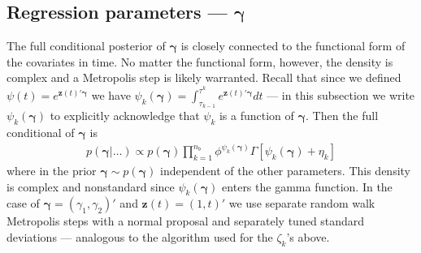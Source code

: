 \documentclass{article}
\begin{document}
\subsection{Regression parameters --- $\bm{\gamma}$}
The full conditional posterior of $\bm{\gamma}$ is closely connected to the functional form of the covariates in time. No matter the functional form, however, the density is complex and a Metropolis step is likely warranted. Recall that since we defined $\psi(t) = e^{\bm{z}(t)'\bm{\gamma}}$ we have $\psi_k(\bm{\gamma}) = \int_{\tau_{k-1}}^{\tau^k}e^{\bm{z}(t)'\bm{\gamma}}dt$ --- in this subsection we write $\psi_k(\bm{\gamma})$ to explicitly acknowledge that $\psi_k$ is a function of $\bm{\gamma}$. Then the full conditional of $\bm{\gamma}$ is
\begin{align*}
p(\bm{\gamma}|\dots) \propto p(\bm{\gamma})\prod_{k=1}^{n_b}\phi^{\psi_k(\bm{\gamma})}\Gamma[\psi_k(\bm{\gamma}) + \eta_k]
\end{align*}
where in the prior $\bm{\gamma} \sim p(\bm{\gamma})$ independent of the other parameters. This density is complex and nonstandard since $\psi_k(\bm{\gamma})$ enters the gamma function. In the case of $\bm{\gamma} = (\gamma_1, \gamma_2)'$ and $\bm{z}(t) = (1, t)'$ we use separate random walk Metropolis steps with a normal proposal and separately tuned standard deviations --- analogous to the algorithm used for the $\zeta_k$'s above.
\end{document}
